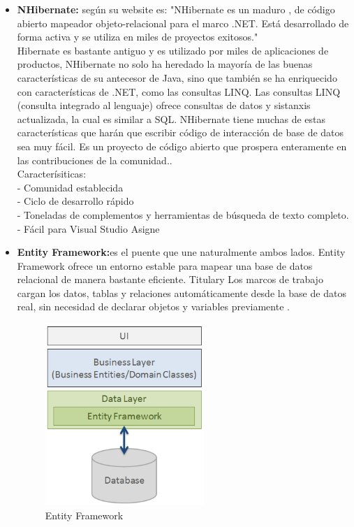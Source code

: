 \documentclass[preprint,12pt]{elsarticle}
\begin{document}
\begin{itemize}
	\item \textbf{NHibernate:} según su website es: "NHibernate es un maduro , de código abierto mapeador objeto-relacional para el marco .NET. Está desarrollado de forma activa y se utiliza en miles de proyectos exitosos."\cite{nhibernate}\\
Hibernate es bastante antiguo y es utilizado por miles de aplicaciones de productos, NHibernate no solo ha heredado la mayoría de las buenas características de su antecesor de Java, sino que también se ha enriquecido con características de .NET, como las consultas LINQ. Las consultas LINQ (consulta integrado al lenguaje) ofrece consultas de datos y sistanxis actualizada, la cual es similar a SQL.
NHibernate tiene muchas de estas características que harán que escribir código de interacción de base de datos sea muy fácil. Es un proyecto de código abierto que prospera enteramente en las contribuciones de la comunidad..\cite{chatekar2015}\\
Caracterísiticas:\\
- Comunidad establecida\\
- Ciclo de desarrollo rápido\\
- Toneladas de complementos y herramientas de búsqueda de texto completo.\\
- Fácil para Visual Studio Asigne
	\item \textbf{Entity Framework:}es el puente que une naturalmente ambos lados. Entity Framework ofrece un entorno estable para mapear una base de datos relacional de manera bastante eficiente. Titulary Los marcos de trabajo cargan los datos, tablas y relaciones automáticamente desde la base de datos real, sin necesidad de declarar objetos y variables previamente .\cite {ef} \\

\begin{figure}[htb]
	\begin{center}
		\includegraphics[width=6cm]{./IMAGENES/ef} 
		\caption{Entity Framework}
	\end{center}
\end{figure}


\end{itemize}
\end{document}
